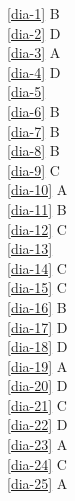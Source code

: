 \noindent \ref{dia-1} B\\
\ref{dia-2} D\\
\ref{dia-3} A\\
\ref{dia-4} D\\
\ref{dia-5} \\
\ref{dia-6} B\\
\ref{dia-7} B\\
\ref{dia-8} B\\
\ref{dia-9} C\\
\ref{dia-10} A\\
\ref{dia-11} B\\
\ref{dia-12} C\\
\ref{dia-13} \\
\ref{dia-14} C\\
\ref{dia-15} C\\
\ref{dia-16} B\\
\ref{dia-17} D\\
\ref{dia-18} D\\
\ref{dia-19} A\\
\ref{dia-20} D\\
\ref{dia-21} C\\
\ref{dia-22} D\\
\ref{dia-23} A\\
\ref{dia-24} C\\
\ref{dia-25} A\\
